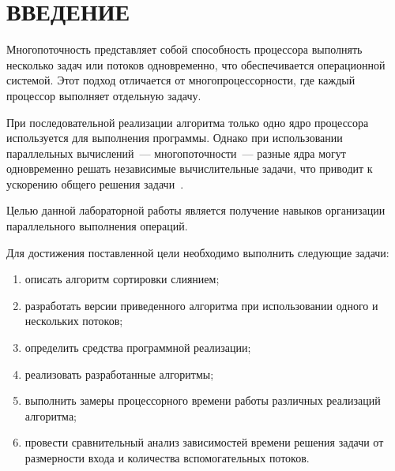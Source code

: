 \chapter*{\hfill{\centering  ВВЕДЕНИЕ}\hfill}

Многопоточность представляет собой способность процессора выполнять несколько задач или потоков одновременно, что обеспечивается операционной системой. Этот подход отличается от многопроцессорности, где каждый процессор выполняет отдельную задачу.

При последовательной реализации алгоритма только одно ядро процессора используется для выполнения программы. Однако при использовании параллельных вычислений~--- многопоточности~--- разные ядра могут одновременно решать независимые вычислительные задачи, что приводит к ускорению общего решения задачи~\cite{muti-thread}.

Целью данной лабораторной работы является получение навыков организации параллельного выполнения операций.

Для достижения поставленной цели необходимо выполнить следующие задачи:
\begin{enumerate}
	\item описать алгоритм сортировки слиянием;
	\item разработать версии приведенного алгоритма при использовании одного и нескольких потоков;
	\item определить средства программной реализации;
	\item реализовать разработанные алгоритмы;
	\item выполнить замеры процессорного времени работы различных реализаций алгоритма;
	\item провести сравнительный анализ зависимостей времени решения задачи от размерности входа и количества вспомогательных потоков.
\end{enumerate}